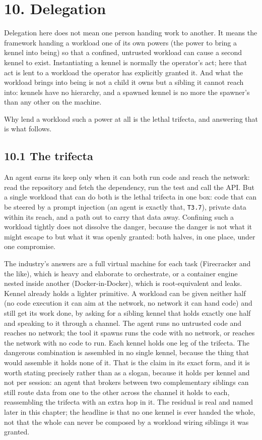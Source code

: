 \hypertarget{delegation}{%
\chapter{10. Delegation}\label{delegation}}

Delegation here does not mean one person handing work to another. It
means the framework handing a workload one of its own powers (the power
to bring a kennel into being) so that a confined, untrusted workload can
cause a second kennel to exist. Instantiating a kennel is normally the
operator's act; here that act is lent to a workload the operator has
explicitly granted it. And what the workload brings into being is not a
child it owns but a sibling it cannot reach into: kennels have no
hierarchy, and a spawned kennel is no more the spawner's than any other
on the machine.

Why lend a workload such a power at all is the lethal trifecta, and
answering that is what follows.

\hypertarget{the-trifecta}{%
\section{10.1 The trifecta}\label{the-trifecta}}

An agent earns its keep only when it can both run code and reach the
network: read the repository and fetch the dependency, run the test and
call the API. But a single workload that can do both is the lethal
trifecta in one box: code that can be steered by a prompt injection (an
agent is exactly that, \texttt{T3.7}), private data within its reach,
and a path out to carry that data away. Confining such a workload
tightly does not dissolve the danger, because the danger is not what it
might escape to but what it was openly granted: both halves, in one
place, under one compromise.

The industry's answers are a full virtual machine for each task
(Firecracker and the like), which is heavy and elaborate to orchestrate,
or a container engine nested inside another (Docker-in-Docker), which is
root-equivalent and leaks. Kennel already holds a lighter primitive. A
workload can be given neither half (no code execution it can aim at the
network, no network it can hand code) and still get its work done, by
asking for a sibling kennel that holds exactly one half and speaking to
it through a channel. The agent runs no untrusted code and reaches no
network; the tool it spawns runs the code with no network, or reaches
the network with no code to run. Each kennel holds one leg of the
trifecta. The dangerous combination is assembled in no single kennel,
because the thing that would assemble it holds none of it. That is the
claim in its exact form, and it is worth stating precisely rather than
as a slogan, because it holds per kennel and not per session: an agent
that brokers between two complementary siblings can still route data
from one to the other across the channel it holds to each, reassembling
the trifecta with an extra hop in it. The residual is real and named
later in this chapter; the headline is that no one kennel is ever handed
the whole, not that the whole can never be composed by a workload wiring
siblings it was granted.

